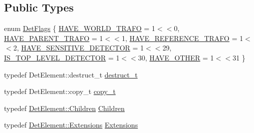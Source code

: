 \subsection*{Public Types}
\begin{DoxyCompactItemize}
\item 
enum \hyperlink{class_d_d4hep_1_1_geometry_1_1_det_element_object_a04115ec0fa8d9df9b7d47ed45e9b037d}{Det\+Flags} \{ \newline
\hyperlink{class_d_d4hep_1_1_geometry_1_1_det_element_object_a04115ec0fa8d9df9b7d47ed45e9b037dadeb5adca04d132e1d1a9dff4b4041378}{H\+A\+V\+E\+\_\+\+W\+O\+R\+L\+D\+\_\+\+T\+R\+A\+FO} = 1$<$$<$0, 
\hyperlink{class_d_d4hep_1_1_geometry_1_1_det_element_object_a04115ec0fa8d9df9b7d47ed45e9b037da92cecd0c1ce2c726acd404dfc5dc6ed0}{H\+A\+V\+E\+\_\+\+P\+A\+R\+E\+N\+T\+\_\+\+T\+R\+A\+FO} = 1$<$$<$1, 
\hyperlink{class_d_d4hep_1_1_geometry_1_1_det_element_object_a04115ec0fa8d9df9b7d47ed45e9b037da5fb13dc50b7d71fdfb1539ef4f2ba2d9}{H\+A\+V\+E\+\_\+\+R\+E\+F\+E\+R\+E\+N\+C\+E\+\_\+\+T\+R\+A\+FO} = 1$<$$<$2, 
\hyperlink{class_d_d4hep_1_1_geometry_1_1_det_element_object_a04115ec0fa8d9df9b7d47ed45e9b037da805055fa07991eced9a624194ea95c1c}{H\+A\+V\+E\+\_\+\+S\+E\+N\+S\+I\+T\+I\+V\+E\+\_\+\+D\+E\+T\+E\+C\+T\+OR} = 1$<$$<$29, 
\newline
\hyperlink{class_d_d4hep_1_1_geometry_1_1_det_element_object_a04115ec0fa8d9df9b7d47ed45e9b037da7fc93a02de387e3a443e7f900157f2dd}{I\+S\+\_\+\+T\+O\+P\+\_\+\+L\+E\+V\+E\+L\+\_\+\+D\+E\+T\+E\+C\+T\+OR} = 1$<$$<$30, 
\hyperlink{class_d_d4hep_1_1_geometry_1_1_det_element_object_a04115ec0fa8d9df9b7d47ed45e9b037da81ef79f7722d59d01cb24098b3b4492b}{H\+A\+V\+E\+\_\+\+O\+T\+H\+ER} = 1$<$$<$31
 \}
\item 
typedef Det\+Element\+::destruct\+\_\+t \hyperlink{class_d_d4hep_1_1_geometry_1_1_det_element_object_af4773c2a725fc7076297670a7ae1ac41}{destruct\+\_\+t}
\item 
typedef Det\+Element\+::copy\+\_\+t \hyperlink{class_d_d4hep_1_1_geometry_1_1_det_element_object_a2780058563d2399014b51afa789ebd21}{copy\+\_\+t}
\item 
typedef \hyperlink{class_d_d4hep_1_1_geometry_1_1_det_element_afc41f63ac2a467f5077d1cca1292d580}{Det\+Element\+::\+Children} \hyperlink{class_d_d4hep_1_1_geometry_1_1_det_element_object_aaf04a1f51d7a7ce4c0e0dc4863268d8a}{Children}
\item 
typedef \hyperlink{class_d_d4hep_1_1_geometry_1_1_det_element_aa3651ed4a11789675607a06d2f6846ff}{Det\+Element\+::\+Extensions} \hyperlink{class_d_d4hep_1_1_geometry_1_1_det_element_object_ac74df66a49fc20d985f033a063b7dbab}{Extensions}

\end{DoxyCompactItemize}
